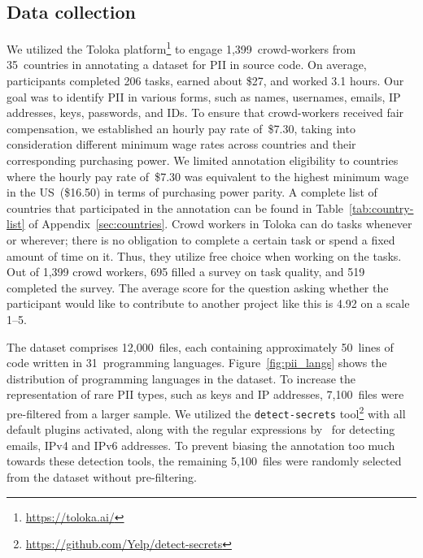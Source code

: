 \documentclass[10pt]{article} %
\begin{document}

\subsection{Data collection}\label{sec:pii_datacollection}
We utilized the Toloka platform\footnote{\url{https://toloka.ai/}} to engage 1,399~crowd-workers from 35~countries in annotating a dataset for PII in source code. On average, participants completed 206 tasks, earned about \$27, and worked 3.1 hours. Our goal was to identify PII in various forms, such as names, usernames, emails, IP addresses, keys, passwords, and IDs. To ensure that crowd-workers received fair compensation, we established an hourly pay rate of~\$7.30, taking into consideration different minimum wage rates across countries and their corresponding purchasing power. We limited annotation eligibility to countries where the hourly pay rate of~\$7.30 was equivalent to the highest minimum wage in the US~(\$16.50) in terms of purchasing power parity. A complete list of countries that participated in the annotation can be found in Table~\ref{tab:country-list} of Appendix~\ref{sec:countries}. Crowd workers in Toloka can do tasks whenever or wherever; there is no obligation to complete a certain task or spend a fixed amount of time on it. Thus, they utilize free choice when working on the tasks. Out of 1,399 crowd workers, 695 filled a survey on task quality, and 519 completed the survey. The average score for the question asking whether the participant would like to contribute to another project like this is 4.92 on a scale 1--5. 

The dataset comprises 12,000~files, each containing approximately 50~lines of code written in 31~programming languages. Figure~\ref{fig:pii_langs} shows the distribution of programming languages in the dataset. To increase the representation of rare PII types, such as keys and IP addresses, 7,100~files were pre-filtered from a larger sample. We utilized the \texttt{detect-secrets} tool\footnote{\url{https://github.com/Yelp/detect-secrets}} with all default plugins activated, along with the regular expressions by~\citet{allal2023santacoder} for detecting emails, IPv4 and IPv6 addresses. To prevent biasing the annotation too much towards these detection tools, the remaining 5,100~files were randomly selected from the dataset without pre-filtering.
\end{document}
